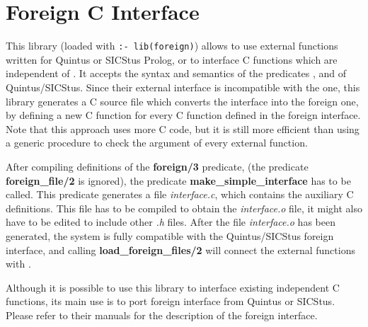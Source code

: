 %
% 
% 
% 
% 
%
%
%
%
\chapter{Foreign C Interface}
\label{libforeign}
This library (loaded with {\tt :- lib(foreign)})
allows to use external functions written
for Quintus or SICStus Prolog, or to interface
C functions which are independent of {\eclipse}.
It accepts the syntax and semantics of the
predicates ,  and 
of Quintus/SICStus.
Since their external interface is incompatible with the {\eclipse} one,
this library generates a C source file which converts the \eclipse
interface into the foreign one, by defining a new C function
for every C function defined in the foreign interface.
Note that this approach uses more C code, but it is still more efficient
than using a generic procedure to check the argument
of every external function.

After compiling definitions of the {\bf foreign/3} predicate,
(the predicate {\bf foreign_file/2} is ignored),
the predicate {\bf make_simple_interface} has to be called.
This predicate generates a file {\it interface.c}, which contains
the auxiliary C definitions.
This file has to be compiled to obtain the {\it interface.o} file,
it might also have to be edited to include other {\it .h} files.
After the file {\it interface.o} has been generated,
the system is fully compatible with the Quintus/SICStus foreign
interface, and calling {\bf load_foreign_files/2} will connect
the external functions with {\eclipse}.

Although it is possible to use this library to interface
existing independent C functions, its main use is to
port foreign interface from Quintus or SICStus.
Please refer to their manuals for the description of the
foreign interface.

